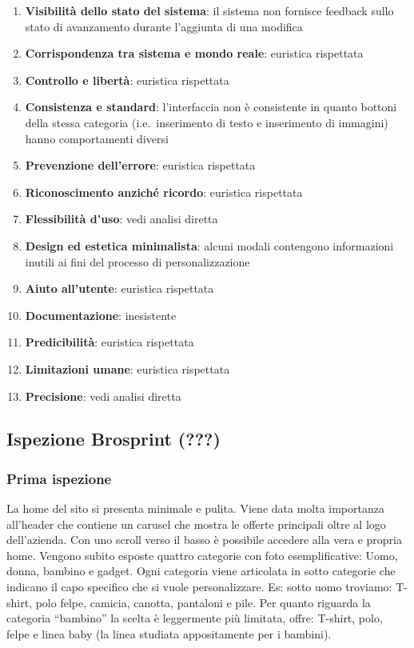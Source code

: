 \documentclass[12pt,italian,]{report}
\providecommand{\tightlist}{%
  \setlength{\itemsep}{0pt}\setlength{\parskip}{0pt}}
\begin{document}
\begin{enumerate}
\def\labelenumi{\arabic{enumi}.}
\tightlist
\item
  \textbf{Visibilità dello stato del sistema}: il sistema non fornisce
  feedback sullo stato di avanzamento durante l'aggiunta di una modifica
\item
  \textbf{Corrispondenza tra sistema e mondo reale}: euristica
  rispettata
\item
  \textbf{Controllo e libertà}: euristica rispettata
\item
  \textbf{Consistenza e standard}: l'interfaccia non è consistente in
  quanto bottoni della stessa categoria (i.e.~inserimento di testo e
  inserimento di immagini) hanno comportamenti diversi
\item
  \textbf{Prevenzione dell'errore}: euristica rispettata
\item
  \textbf{Riconoscimento anziché ricordo}: euristica rispettata
\item
  \textbf{Flessibilità d'uso}: vedi analisi diretta
\item
  \textbf{Design ed estetica minimalista}: alcuni modali contengono
  informazioni inutili ai fini del processo di personalizzazione
\item
  \textbf{Aiuto all'utente}: euristica rispettata
\item
  \textbf{Documentazione}: inesistente
\item
  \textbf{Predicibilità}: euristica rispettata
\item
  \textbf{Limitazioni umane}: euristica rispettata
\item
  \textbf{Precisione}: vedi analisi diretta
\end{enumerate}

\hypertarget{ispezione-brosprint-brosprint}{%
\subsection{\texorpdfstring{Ispezione Brosprint
({\textbf{???}})}{Ispezione Brosprint (???)}}\label{ispezione-brosprint-brosprint}}

\hypertarget{prima-ispezione-1}{%
\subsubsection{Prima ispezione}\label{prima-ispezione-1}}

La home del sito si presenta minimale e pulita. Viene data molta
importanza all'header che contiene un carusel che mostra le offerte
principali oltre al logo dell'azienda. Con uno scroll verso il basso è
possibile accedere alla vera e propria home. Vengono subito esposte
quattro categorie con foto esemplificative: Uomo, donna, bambino e
gadget. Ogni categoria viene articolata in sotto categorie che indicano
il capo specifico che si vuole personalizzare. Es: sotto uomo troviamo:
T-shirt, polo felpe, camicia, canotta, pantaloni e pile. Per quanto
riguarda la categoria ``bambino'' la scelta è leggermente più limitata,
offre: T-shirt, polo, felpe e linea baby (la linea studiata
appositamente per i bambini).
\end{document}
